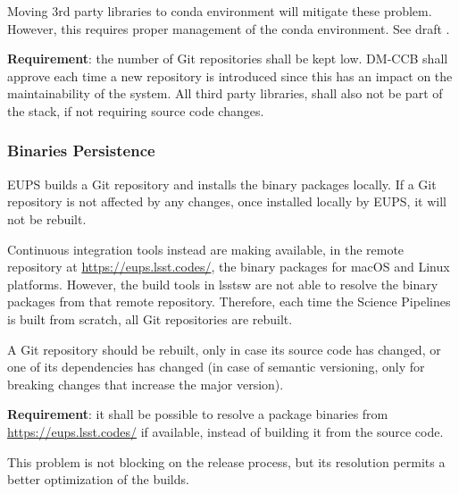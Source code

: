 Moving 3rd party libraries to conda environment will mitigate these problem. 
However, this requires proper management of the conda environment. See draft .

\textbf{Requirement}: the number of Git repositories shall be kept low. DM-CCB shall approve each time a new repository is introduced since this has an impact on the maintainability of the system. 
All third party libraries, shall also not be part of the stack, if not requiring source code changes.


\subsubsection{Binaries Persistence} \label{sec:problemPersistence}

EUPS builds a Git repository and installs the binary packages locally. 
If a Git repository is not affected by any changes, once installed locally by EUPS, it will not be rebuilt.

Continuous integration tools instead are making available, in the remote repository at \url{https://eups.lsst.codes/}, the binary packages for macOS and Linux platforms.
However, the build tools in lsstsw are not able to resolve the binary packages from that remote repository.
Therefore, each time the Science Pipelines is built from scratch, all Git repositories are rebuilt.

A Git repository should be rebuilt, only in case its source code has changed, or one of its dependencies has changed (in case of semantic versioning, only for breaking changes that increase the major version).

\textbf{Requirement}: it shall be possible to resolve a package binaries from \url{https://eups.lsst.codes/} if available, instead of building it from the source code.

This problem is not blocking on the release process, but its resolution permits a better optimization of the builds.


